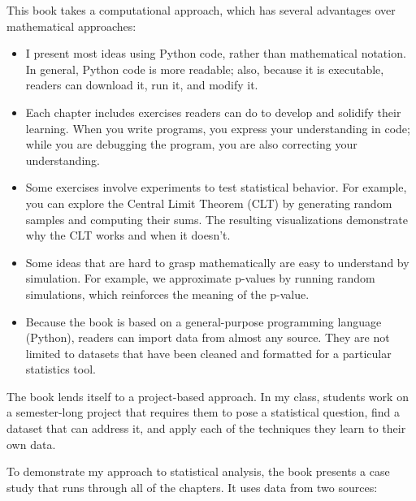 \documentclass[12pt]{book}
\begin{document}
This book takes a computational approach, which has several
advantages over mathematical approaches:

\begin{itemize}

\item I present most ideas using Python code, rather than
  mathematical notation.  In general, Python code is more readable;
  also, because it is executable, readers can download it, run it,
  and modify it.

\item Each chapter includes exercises readers can do to develop
  and solidify their learning.  When you write programs, you
  express your understanding in code; while you are debugging the
  program, you are also correcting your understanding.

\item Some exercises involve experiments to test statistical
  behavior.  For example, you can explore the Central Limit Theorem
  (CLT) by generating random samples and computing their sums.  The
  resulting visualizations demonstrate why the CLT works and when
  it doesn't.

\item Some ideas that are hard to grasp mathematically are easy to
  understand by simulation.  For example, we approximate p-values by
  running random simulations, which reinforces the meaning of the
  p-value.

\item Because the book is based on a general-purpose programming
  language (Python), readers can import data from almost any source.
  They are not limited to datasets that have been cleaned and
  formatted for a particular statistics tool.

\end{itemize}

The book lends itself to a project-based approach.  In my class,
students work on a semester-long project that requires them to pose a
statistical question, find a dataset that can address it, and apply
each of the techniques they learn to their own data.

To demonstrate my approach to statistical analysis, the book
presents a case study that runs through all of the chapters.  It uses
data from two sources:
\end{document}
